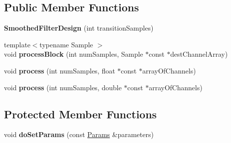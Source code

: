 \subsection*{Public Member Functions}
\begin{DoxyCompactItemize}
\item 
\hypertarget{classDsp_1_1SmoothedFilterDesign_a835b0ad7f0c0da97f3f4a11d22eb4bee}{{\bfseries Smoothed\-Filter\-Design} (int transition\-Samples)}\label{classDsp_1_1SmoothedFilterDesign_a835b0ad7f0c0da97f3f4a11d22eb4bee}

\item 
\hypertarget{classDsp_1_1SmoothedFilterDesign_ac72e121621dae84ef21fd29860dc6e96}{{\footnotesize template$<$typename Sample $>$ }\\void {\bfseries process\-Block} (int num\-Samples, Sample $\ast$const $\ast$dest\-Channel\-Array)}\label{classDsp_1_1SmoothedFilterDesign_ac72e121621dae84ef21fd29860dc6e96}

\item 
\hypertarget{classDsp_1_1SmoothedFilterDesign_ac56c6cf7903abb7621729f4a4cf6c28e}{void {\bfseries process} (int num\-Samples, float $\ast$const $\ast$array\-Of\-Channels)}\label{classDsp_1_1SmoothedFilterDesign_ac56c6cf7903abb7621729f4a4cf6c28e}

\item 
\hypertarget{classDsp_1_1SmoothedFilterDesign_ac8e233fabbd273b0c5a7cd72f093a5e9}{void {\bfseries process} (int num\-Samples, double $\ast$const $\ast$array\-Of\-Channels)}\label{classDsp_1_1SmoothedFilterDesign_ac8e233fabbd273b0c5a7cd72f093a5e9}

\end{DoxyCompactItemize}
\subsection*{Protected Member Functions}
\begin{DoxyCompactItemize}
\item 
\hypertarget{classDsp_1_1SmoothedFilterDesign_ad42e22cb4e7d7b6a8036359e91a6b2b0}{void {\bfseries do\-Set\-Params} (const \hyperlink{structDsp_1_1Params}{Params} \&parameters)}\label{classDsp_1_1SmoothedFilterDesign_ad42e22cb4e7d7b6a8036359e91a6b2b0}

\end{DoxyCompactItemize}
